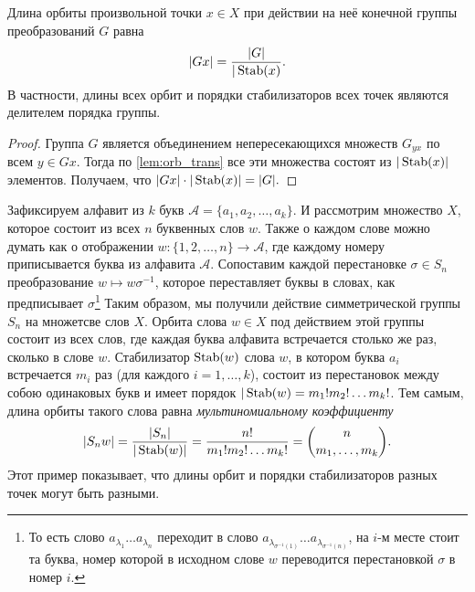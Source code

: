 \begin{proposition}
Длина орбиты произвольной точки $x \in X$ при действии на неё конечной группы преобразований $G$ равна $$|Gx| = \frac{|G|}{|\operatorname{Stab}(x)}.$$ В частности, длины всех орбит и порядки стабилизаторов всех точек являются делителем порядка группы.
\end{proposition}
\begin{proof}
    Группа $G$ является объединением непересекающихся множеств $G_{yx}$ по всем $y \in Gx$. Тогда по \cref{lem:orb_trans} все эти множества состоят из $|\operatorname{Stab}(x)|$ элементов. Получаем, что $|Gx|\cdot|\operatorname{Stab}(x)|=|G|.$
\end{proof}

\begin{example}
    Зафиксируем алфавит из $k$ букв $\mathcal A = \{a_1, a_2, \ldots, a_k\}$. И рассмотрим множество $X$, которое состоит из всех $n$ буквенных слов $w$. Также о каждом слове можно думать как о отображении $w \colon \{1, 2, \ldots, n \} \to \mathcal A$, где каждому номеру приписывается буква из алфавита $\mathcal A$. Сопоставим каждой перестановке $\sigma \in S_n$ преобразование $w \mapsto w\sigma^{-1}$, которое переставляет буквы в словах, как предписывает $\sigma$\footnote{То есть слово $a_{\lambda_1}\ldots a_{\lambda_n}$ переходит в слово $a_{\lambda_{\sigma^{-1}(1)}}\ldots a_{\lambda_{\sigma^{-1}(n)}}$, на $i$-м месте стоит та буква, номер которой в исходном слове $w$ переводится перестановкой $\sigma$ в номер $i$.}
    Таким образом, мы получили действие симметрической группы $S_n$ на множетсве слов $X$. Орбита слова $w \in X$ под действием этой группы состоит из всех слов, где каждая буква алфавита встречается столько же раз, сколько в слове $w$. Стабилизатор $\operatorname{Stab}(w)$ слова $w$, в котором буква $a_i$ встречается $m_i$ раз (для каждого $i = 1, \ldots, k$), состоит из перестановок между собою одинаковых букв и имеет порядок $|\operatorname{Stab}(w) = m_1!m_2!\ldots m_k!$. Тем самым, длина орбиты такого слова равна \emph{мультиномиальному коэффициенту}
    \[ |S_nw| = \frac{|S_n|}{|\operatorname{Stab}(w)|} = \frac{n!}{m_1!m_2!\ldots m_k!} = \binom{n}{m_1, \ldots, m_k}.
    \]
Этот пример показывает, что длины орбит и порядки стабилизаторов разных точек могут быть разными.
\end{example}
